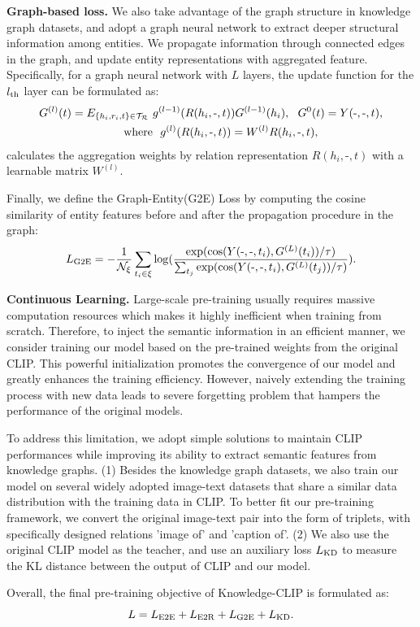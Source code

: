 \textbf{Graph-based loss.} We also take advantage of the graph structure in knowledge graph datasets, and adopt a graph neural network to extract deeper structural information among entities. We propagate information through connected edges in the graph, and update entity representations with aggregated feature. Specifically, for a graph neural network with $L$ layers, the update function for the $l_{\rm th}$ layer can be formulated as:
\begin{align}
    G^{(l)}(t) = E_{\{h_i,r_i,t\} \in \mathcal{T_R}} \ & g^{(l-1)}(R(h_i,\text{-},t))G^{(l-1)}(h_i), \ \ G^{0}(t) = Y(\text{-},\text{-},t),\\
     {\rm where} &\ \ g^{(l)}(R(h_i,\text{-},t))=W^{(l)}R(h_i,\text{-},t),
\end{align}
calculates the aggregation weights by relation representation $R(h_i,\text{-},t)$ with a learnable matrix $W^{(l)}$.

Finally, we define the Graph-Entity(G2E) Loss by computing the cosine similarity of entity features before and after the propagation procedure in the graph:
\begin{align}
    L_{\rm G2E} = -\frac{1}{\mathcal{N}_{\xi}} \sum_{t_i \in \xi} {\rm log}(\frac{{\rm exp} ({\rm cos}(Y(\text{-},\text{-},t_i),G^{(L)}(t_i))/\tau)}{\sum_{t_j} {\rm exp} ({\rm cos}(Y(\text{-},\text{-},t_i),G^{(L)}(t_j))/\tau)}).
\end{align}

\textbf{Continuous Learning.} Large-scale pre-training usually requires massive computation resources which makes it highly inefficient when training from scratch. Therefore, to inject the semantic information in an efficient manner, we consider training our model based on the pre-trained weights from the original CLIP. This powerful initialization promotes the convergence of our model and greatly enhances the training efficiency. However, naively extending the training process with new data leads to severe forgetting problem that hampers the performance of the original models. 

To address this limitation, we adopt simple solutions to maintain CLIP performances while improving its ability to extract semantic features from knowledge graphs. (1) Besides the knowledge graph datasets, we also train our model on several widely adopted image-text datasets that share a similar data distribution with the training data in CLIP. To better fit our pre-training framework, we convert the original image-text pair into the form of triplets, with specifically designed relations 'image of' and 'caption of'. (2) We also use the original CLIP model as the teacher, and use an auxiliary loss $L_{\rm KD}$ to measure the KL distance between the output of CLIP and our model.

Overall, the final pre-training objective of Knowledge-CLIP is formulated as:
\begin{equation}
    L = L_{\rm E2E} + L_{\rm E2R} + L_{\rm G2E} + L_{\rm KD}.
\end{equation}

